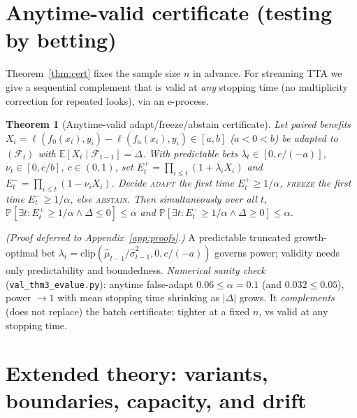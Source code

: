 \documentclass[11pt]{article}
\theoremstyle{plain}
\newtheorem{theorem}{Theorem}
\theoremstyle{definition}
\newcommand{\E}{\mathbb{E}}
\renewcommand{\Pr}{\mathbb{P}}
\begin{document}
\section{Anytime-valid certificate (testing by betting)}\label{app:anytime}
Theorem~\ref{thm:cert} fixes the sample size $n$ in advance. For streaming TTA we give a
sequential complement that is valid at \emph{any} stopping time (no multiplicity correction
for repeated looks), via an e-process.
\begin{theorem}[Anytime-valid adapt/freeze/abstain certificate]\label{thm:anytime}
Let paired benefits $X_i=\ell(f_0(x_i),y_i)-\ell(f_a(x_i),y_i)\in[a,b]$ ($a<0<b$) be
adapted to $(\mathcal F_t)$ with $\E[X_t\mid\mathcal F_{t-1}]=\Delta$. With predictable
bets $\lambda_t\in[0,c/(-a)]$, $\nu_t\in[0,c/b]$, $c\in(0,1)$, set
$E_t^{+}=\prod_{i\le t}(1+\lambda_i X_i)$ and $E_t^{-}=\prod_{i\le t}(1-\nu_i X_i)$.
Decide \textsc{adapt} the first time $E_t^{+}\ge1/\alpha$, \textsc{freeze} the first time
$E_t^{-}\ge1/\alpha$, else \textsc{abstain}. Then simultaneously over all $t$,
$\Pr[\exists t: E_t^{+}\ge1/\alpha \wedge \Delta\le0]\le\alpha$ and
$\Pr[\exists t: E_t^{-}\ge1/\alpha \wedge \Delta\ge0]\le\alpha$.
\end{theorem}
\emph{(Proof deferred to Appendix~\ref{app:proofs}.)}
\noindent A predictable truncated growth-optimal bet
$\lambda_t=\mathrm{clip}(\widehat\mu_{t-1}/\widehat\sigma^2_{t-1},0,c/(-a))$ governs power;
validity needs only predictability and boundedness. \emph{Numerical sanity check}
(\texttt{val\_thm3\_evalue.py}): anytime false-adapt $0.06\le\alpha{=}0.1$ (and
$0.032\le0.05$), power $\to1$ with mean stopping time shrinking as $|\Delta|$ grows. It
\emph{complements} (does not replace) the batch certificate: tighter at a fixed $n$, vs
valid at any stopping time.

\section{Extended theory: variants, boundaries, capacity, and drift}\label{app:theory-ext}
\end{document}
